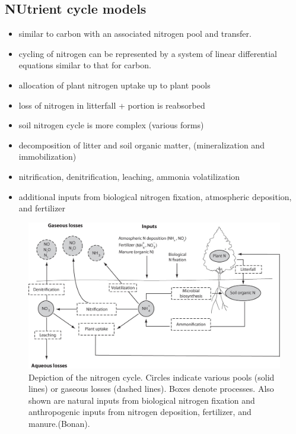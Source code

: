 \documentclass[
  12pt,
  oneside]{book}
\begin{document}
\hypertarget{nutrient-cycle-models}{%
\subsection{NUtrient cycle models}\label{nutrient-cycle-models}}

\begin{itemize}
\item
  similar to carbon with an associated nitrogen pool and transfer.
\item
  cycling of nitrogen can be represented by a system of linear differential equations similar to that for carbon.
\item
  allocation of plant nitrogen uptake up to plant pools
\item
  loss of nitrogen in litterfall + portion is reabsorbed
\item
  soil nitrogen cycle is more complex (various forms)
\item
  decomposition of litter and soil organic matter, (mineralization and immobilization)
\item
  nitrification, denitrification, leaching, ammonia volatilization
\item
  additional inputs from biological nitrogen fixation, atmospheric deposition, and fertilizer
\end{itemize}

\begin{figure}

{\centering \includegraphics[width=0.8\linewidth]{figures/chap5/f519_N_cycle} 

}

\caption{Depiction of the nitrogen cycle. Circles indicate various pools (solid lines) or gaseous losses (dashed lines). Boxes denote processes. Also shown are natural inputs from biological nitrogen fixation and anthropogenic inputs from nitrogen deposition, fertilizer, and manure.(Bonan).}\label{fig:f519}
\end{figure}
\end{document}
